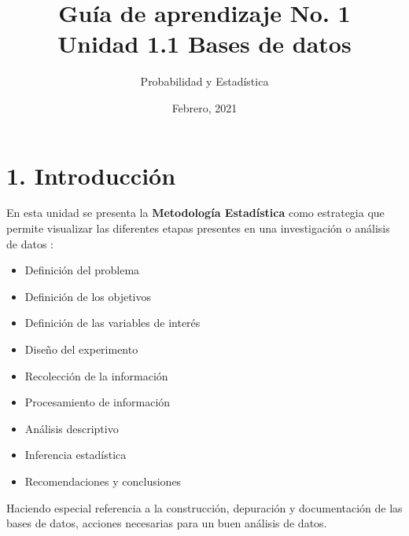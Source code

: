 \documentclass[base=hide,11pt]{elegantbook}
\title{Guía de  aprendizaje No. 1\\
	Unidad  1.1 Bases de datos}
\subtitle{Probabilidad y Estadística}
\institute{Pontificia Universidad Javeriana Cali}
\date{Febrero, 2021}
\begin{document}


\maketitle

\frontmatter
%
\mainmatter

\section*{1. Introducción}

En esta unidad se  presenta  la \textbf{Metodología Estadística} como  estrategia que  permite  visualizar las diferentes etapas presentes en una investigación  o análisis de  datos :

\begin{itemize}
	\item Definición del problema
	\item Definición de los objetivos
	\item Definición de las variables de interés
	\item Diseño del experimento
	\item Recolección de la información
	\item Procesamiento de información
	\item Análisis descriptivo
	\item Inferencia estadística
	\item Recomendaciones y conclusiones
\end{itemize}

Haciendo especial referencia a la construcción, depuración  y documentación  de las bases de datos, acciones necesarias para un  buen  análisis de datos.\\
\end{document}
